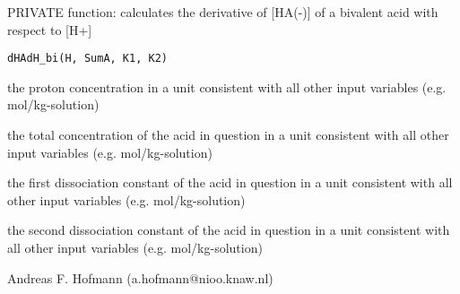 \documentclass{article}
\begin{document}
\begin{Description}\relax
PRIVATE function: calculates the derivative of [HA(-)] of a bivalent acid with respect to [H+]
\end{Description}
\begin{Usage}
\begin{verbatim}dHAdH_bi(H, SumA, K1, K2)\end{verbatim}
\end{Usage}
\begin{Arguments}
\begin{ldescription}
\item[\code{H }] the proton concentration in a unit consistent with all other input variables (e.g. mol/kg-solution)
\item[\code{SumA }] the total concentration of the acid in question in a unit consistent with all other input variables (e.g. mol/kg-solution)
\item[\code{K1 }] the first dissociation constant of the acid in question in a unit consistent with all other input variables (e.g. mol/kg-solution)
\item[\code{K2 }] the second dissociation constant of the acid in question in a unit consistent with all other input variables (e.g. mol/kg-solution)
\end{ldescription}
\end{Arguments}
\begin{Author}\relax
Andreas F. Hofmann (a.hofmann@nioo.knaw.nl)
\end{Author}
\end{document}
